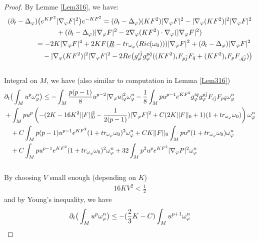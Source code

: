 \documentclass[11pt]{amsart}
\numberwithin{equation}{section}
\begin{document}
 \begin{proof}
By Lemme \ref{Lem316}, we have:
\begin{align}
	& (\partial_t-\Delta_{\varphi})\big(e^{KF^2}|\nabla_{\varphi}F|^2\big)e^{-KF^2} =(\partial_t-\Delta_{\varphi})(KF^2)|\nabla_{\varphi}F|^2-|\nabla_{\varphi}(KF^2)|^2|\nabla_{\varphi}F|^2 \notag \\
	&\quad\qquad\qquad\qquad +(\partial_t-\Delta_{\varphi})|\nabla_{\varphi}F|^2-2\nabla_{\varphi}(KF^2)\cdot \nabla_{\varphi}(|\nabla_{\varphi}F|^2) \notag\\
	&\qquad\qquad = -2K|\nabla_{\varphi}F|^4 + 2KF(\underline{R}-tr_{\omega_{\varphi}}(Ric(\omega_0)))|\nabla_{\varphi}F|^2 + (\partial_t-\Delta_{\varphi})|\nabla_{\varphi}F|^2 \notag\\
	& \quad\qquad\qquad -|\nabla_{\varphi}(KF^2)|^2|\nabla_{\varphi}F|^2 - 2Re\big(g_{\varphi}^{i\bar{j}}g_{\varphi}^{p\bar{q}}((K F^2)_iF_{p\bar{j}}F_{\bar{q}}+(K F^2)_iF_pF_{,\bar{q}\bar{j}})\big) 
\end{align}\\
Integral on $M$, we have (also similar to computation in Lemma \ref{Lem316}) 
\begin{align}
	&\partial_t\big( \int_M u^p\omega_\varphi^n\big)\le - \int_M \frac{p(p-1)}{8} u^{p-2} |\nabla_\varphi u|^2_\varphi\omega_\varphi^n - \frac{1}{8}\int_M pu^{p-1}e^{K F^2} g_{\varphi}^{i\bar{q}}g_{\varphi}^{p\bar{j}}F_{i\bar{j}}F_{p\bar{q}}\omega_\varphi^n \notag\\
	 & +\int_M pu^{p}\left( -(2K-16K^2 ||F||_0^2-\frac{1}{2(p-1)})|\nabla_\varphi F|^2 +C(2K||F||_0 +1)(1+tr_{\omega_{\varphi}}\omega_0)\right)\omega_\varphi^n \notag\\
	 & \quad +C\int_M p(p-1)u^{p-1}e^{K F^2}(1+tr_{\omega_{\varphi}}\omega_0)^2\omega_{\varphi}^n +CK||F||_0 \int_M pu^p  (1+tr_{\omega_{\varphi}}\omega_0)\omega_\varphi^n \notag\\
	 &\quad + C\int_M pu^{p-1}e^{K F^2}(1+tr_{\omega_{\varphi}}\omega_0)^2\omega_{\varphi}^n + 32\int_M p^2u^pe^{KF^2} |\nabla_\varphi P|^2 \omega_\varphi^n 
\end{align}\\
By choosing $V$ small enough (depending on $K$)
\begin{align}
	16K V^2 <\frac{1}{2}
\end{align}
and by Young's inequality, we have 
\begin{align}
	&\partial_t\big( \int_M u^p\omega_\varphi^n\big)\le -(\frac{2}{3} K-C) \int_M u^{p+1}\omega_\varphi^n \notag\\

\end{align}
\end{proof}
\end{document}
